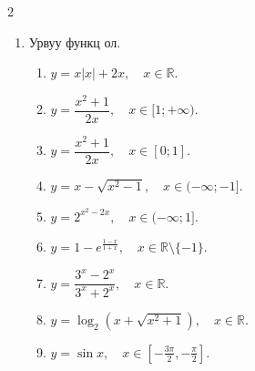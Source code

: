 \begin{multicols}{2}
\begin{enumerate}
\begin{enumerate}
  \item $f(x) = \sin^2 x - 4\sin x + 3$
  \item $f(x) = \sqrt{8 - 2x - x^2}$
  \item $f(x) = \sqrt{2x - 1 - x^2}$
  \item $f(x) = 2^{x^2+4x+5}$
  \item $f(x) = \log_{3}(5 + 4x - x^2)$
  \item $f(x) = \sqrt{2 \log x - (\log x)^2}$
  \item $f(x) = \sin x - 5\cos x$
  \item $f(x) = \dfrac{\sin x - \cos x}{\sin x + \cos x}$
  \item $f(x) = \log_{2}(\cos x + \sin^2 x)$
  \item $f(x) = 1 - \sqrt{9 - \sqrt{2x^2 + 6\sqrt{2x} + 9}}$
  \item $f(x) =
    \begin{cases}
      2x^2 + 8x + 6, & x < -1, \\
      3\sqrt{x+1}, & x \geq -1
    \end{cases}$
  \item $f(x) =
    \begin{cases}
      \dfrac{8}{x}, & x \leq -2, \\
      x^3 + 4, & -2 < x \leq 0, \\
      \dfrac{4}{x^2 + 1}, & x > 0
    \end{cases}$
  \item $f(x) = \dfrac{x^4 + 6x^3 - 27x - 162}{x^2 + 3x - 18}$
\end{enumerate}
\item Урвуу функц ол.
\begin{enumerate}
    \item $y = x|x| + 2x, \quad x \in \mathbb{R}.$
  \item $y = \dfrac{x^2 + 1}{2x}, \quad x \in [1; +\infty).$
  \item $y = \dfrac{x^2 + 1}{2x}, \quad x \in [0; 1].$
  \item $y = x - \sqrt{x^2 - 1}, \quad x \in (-\infty; -1].$
  \item $y = 2^{x^2 - 2x}, \quad x \in (-\infty; 1].$
  \item $y = 1 - e^{\tfrac{1-x}{1+x}}, \quad x \in \mathbb{R} \setminus \{-1\}.$
  \item $y = \dfrac{3^x - 2^x}{3^x + 2^x}, \quad x \in \mathbb{R}.$
  \item $y = \log_{2}\!\left(x + \sqrt{x^2+1}\right), \quad x \in \mathbb{R}.$
  \item $y = \sin x, \quad x \in \left[-\tfrac{3\pi}{2}, -\tfrac{\pi}{2}\right].$

\end{enumerate}
\end{enumerate}
\end{multicols}
